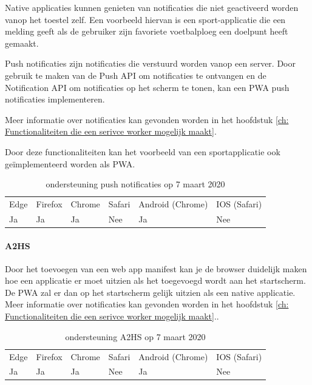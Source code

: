 Native applicaties kunnen genieten van notificaties die niet geactiveerd worden vanop het toestel zelf. Een voorbeeld hiervan is een sport-applicatie die een melding geeft als de gebruiker zijn favoriete voetbalploeg een doelpunt heeft gemaakt.

Push notificaties zijn notificaties die verstuurd worden vanop een server. Door gebruik te maken van de Push API \autocite{Sullivan2020} om notificaties te ontvangen en de Notification API om notificaties op het scherm te tonen, kan een PWA push notificaties implementeren. 

Meer informatie over notificaties kan gevonden worden in het hoofdstuk \ref{ch: Functionaliteiten die een serivce worker mogelijk maakt}.

Door deze functionaliteiten kan het voorbeeld van een sportapplicatie ook geïmplementeerd worden als PWA.

\begin{table}[H]
	\centering
	\begin{tabular}{llllll}
		Edge & Firefox & Chrome & Safari & Android (Chrome) & IOS (Safari) \\
		Ja   & Ja      &  Ja     & Nee     & Ja               & Nee          
	\end{tabular}	
	\caption{ondersteuning push notificaties op 7 maart 2020}
\end{table}



\paragraph{A2HS}


 Door het toevoegen van een web app manifest kan je de browser duidelijk maken hoe een applicatie er moet uitzien als het toegevoegd wordt aan het startscherm. De PWA zal er dan op het startscherm gelijk uitzien als een native applicatie.
	Meer informatie over notificaties kan gevonden worden in het hoofdstuk \ref{ch: Functionaliteiten die een serivce worker mogelijk maakt}..


\begin{table}[H]
	\centering
	\begin{tabular}{llllll}
		Edge & Firefox & Chrome & Safari & Android (Chrome) & IOS (Safari) \\
		Ja   & Ja      &  Ja     & Nee     & Ja               & Nee          
	\end{tabular}	
	\caption{ondersteuning A2HS op 7 maart 2020 }
\end{table}


